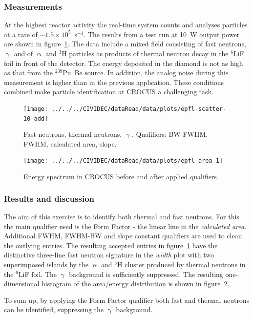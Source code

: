 \subsubsection{Measurements}
At the highest reactor activity the real-time system counts and analyses particles at a rate of $\sim1.5\times10^{5}$~s$^{-1}$. The results from a test run at 10~W output power are shown in figure~\ref{fig:scatterepfl2}. The data include a mixed field consisting of fast neutrons, $\upgamma$ and of $\upalpha$ and $^3$H particles as products of thermal neutron decay in the $^6$LiF foil in front of the detector. The energy deposited in the diamond is not as high as that from the $^{239}$Pu~Be source. In addition, the analog noise during this measurement is higher than in the previous application. These conditions combined make particle identification at CROCUS a challenging task.


\clearpage
\begin{figure}[]
\centering
\texttt{[image: ../../../CIVIDEC/dataRead/data/plots/epfl-scatter-10-add]}
\caption{Fast neutrons, thermal neutrons, $\upgamma$. Qualifiers: BW-FWHM, FWHM, calculated area, slope.}
\label{fig:scatterepfl2}
\end{figure}

\clearpage
\begin{figure}[!t]
\centering
\texttt{[image: ../../../CIVIDEC/dataRead/data/plots/epfl-area-1]}
\caption{Energy spectrum in CROCUS before and after applied qualifiers.}
\label{fig:scatterepfl2area}
\end{figure}


\subsubsection{Results and discussion}
The aim of this exercise is to identify both thermal and fast neutrons. For this the main qualifier used is the Form Factor - the linear line in the \emph{calculated area}. Additional FWHM, FWHM-BW and slope constant qualifiers are used to clean the outlying entries. The resulting accepted entries in figure~\ref{fig:scatterepfl2} have the distinctive three-line fast neutron signature in the \emph{width} plot with two superimposed islands by the $\upalpha$ and $^3$H cluster produced by thermal neutrons in the $^6$LiF foil. The $\upgamma$ background is sufficiently suppressed. The resulting one-dimensional histogram of the area/energy distribution is shown in figure~\ref{fig:scatterepfl2area}.

To sum up, by applying the Form Factor qualifier both fast and thermal neutrons can be identified, suppressing the $\upgamma$ background.



